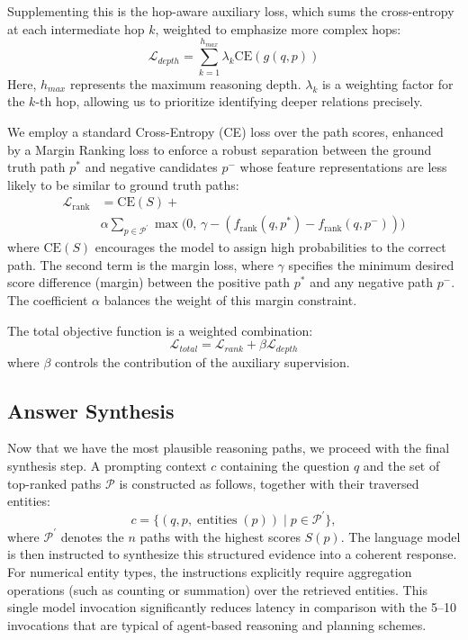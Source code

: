 \documentclass[conference]{IEEEtran}
\begin{document}
Supplementing this is the hop-aware auxiliary loss, which sums the cross-entropy at each intermediate hop $k$, weighted to emphasize more complex hops:
\begin{equation}
    \mathcal{L}_{depth} = \sum_{k=1}^{h_{max}} \lambda_k \text{CE}(g(q,p))
\end{equation}
Here, $h_{max}$ represents the maximum reasoning depth. $\lambda_k$ is a weighting factor for the $k$-th hop, allowing us to prioritize identifying deeper relations precisely.

We employ a standard Cross-Entropy (CE) loss over the path scores, enhanced by a Margin Ranking loss to enforce a robust separation between the ground truth path $p^*$ and negative candidates $p^-$ whose feature representations are less likely to be similar to ground truth paths:
\begin{equation}
    \begin{aligned}
    \mathcal{L}_{\text{rank}} &= \text{CE}(S) + \\
    &\alpha \sum_{p \in \mathcal{P}^\prime} \max\bigl(0, \, \gamma - (f_{\text{rank}}(q, p^*) - f_{\text{rank}}(q, p^-))\bigr)
    \end{aligned}
\end{equation}
where $\text{CE}(S)$ encourages the model to assign high probabilities to the correct path. The second term is the margin loss, where $\gamma$ specifies the minimum desired score difference (margin) between the positive path $p^*$ and any negative path $p^-$. The coefficient $\alpha$ balances the weight of this margin constraint.

The total objective function is a weighted combination:
\begin{equation}
    \mathcal{L}_{total} = \mathcal{L}_{rank} + \beta \mathcal{L}_{depth}
\end{equation}
where $\beta$ controls the contribution of the auxiliary supervision.

\subsection{Answer Synthesis}

Now that we have the most plausible reasoning paths, we proceed with the final synthesis step.
A prompting context $c$ containing the question $q$ and the set of top-ranked paths $\mathcal{P}$ is constructed as follows, together with their traversed entities:
\begin{equation}
   c = \{ (q, p, \operatorname{entities}(p)) \mid p \in \mathcal{P^{\prime}} \},
\end{equation}
where $\mathcal{P^{\prime}}$ denotes the $n$ paths with the highest scores $S(p)$. The language model is then instructed to synthesize this structured evidence into a coherent response. For numerical entity types, the instructions explicitly require aggregation operations (such as counting or summation) over the retrieved entities. This single model invocation significantly reduces latency in comparison with the 5--10 invocations that are typical of agent-based reasoning and planning schemes.
\end{document}
